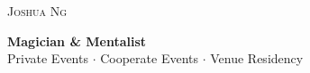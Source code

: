 \documentclass[11pt,a4paper]{memoir}
\begin{document}
    \begin{Spacing}{.75}%
    \noindent
    \begin{centering}
        \Huge{\textsc{Joshua Ng}} \vspace{-1.5mm} \\
    \end{centering}

        \vspace{5mm}%
        \begin{centering}
        {\scriptsize
            \begin{Spacing}{1}%
            \textbf{\large{Magician \& Mentalist}} \vspace{1mm}\\
            Private Events $\cdot$ Cooperate Events $\cdot$ Venue Residency\vspace{2mm}\\
            \end{Spacing}
        }
        \end{centering}
        
        \vspace{5mm}
        

\end{Spacing}
\end{document}
